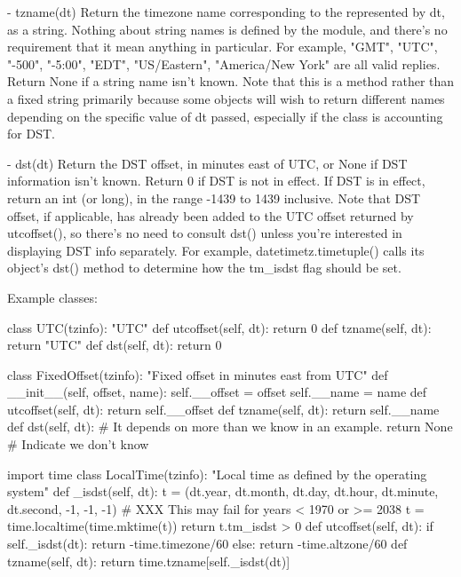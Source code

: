 {  - tzname(dt)
    Return the timezone name corresponding to the  represented
    by dt, as a string.  Nothing about string names is defined by the
     module, and there's no requirement that it mean anything
    in particular.  For example, "GMT", "UTC", "-500", "-5:00", "EDT",
    "US/Eastern", "America/New York" are all valid replies.  Return
    None if a string name isn't known.  Note that this is a method
    rather than a fixed string primarily because some  objects
    will wish to return different names depending on the specific value
    of dt passed, especially if the  class is accounting for DST.

  - dst(dt)
    Return the DST offset, in minutes east of UTC, or None if DST
    information isn't known.  Return 0 if DST is not in effect.
    If DST is in effect, return an int (or long), in the range
    -1439 to 1439 inclusive.  Note that DST offset, if applicable,
    has already been added to the UTC offset returned by utcoffset(),
    so there's no need to consult dst() unless you're interested in
    displaying DST info separately.  For example, datetimetz.timetuple()
    calls its  object's dst() method to determine how the tm_isdst
    flag should be set.

Example  classes:

   class UTC(tzinfo):
        "UTC"
        def utcoffset(self, dt):
            return 0
        def tzname(self, dt):
            return "UTC"
        def dst(self, dt):
            return 0

    class FixedOffset(tzinfo):
        "Fixed offset in minutes east from UTC"
        def __init__(self, offset, name):
            self.__offset = offset
            self.__name = name
        def utcoffset(self, dt):
            return self.__offset
        def tzname(self, dt):
            return self.__name
        def dst(self, dt):
            # It depends on more than we know in an example.
            return None # Indicate we don't know

    import time
    class LocalTime(tzinfo):
        "Local time as defined by the operating system"
        def _isdst(self, dt):
            t = (dt.year, dt.month, dt.day, dt.hour, dt.minute, dt.second,
                 -1, -1, -1)
            # XXX This may fail for years < 1970 or >= 2038
            t = time.localtime(time.mktime(t))
            return t.tm_isdst > 0
        def utcoffset(self, dt):
            if self._isdst(dt):
                return -time.timezone/60
            else:
                return -time.altzone/60
        def tzname(self, dt):
            return time.tzname[self._isdst(dt)]


}
